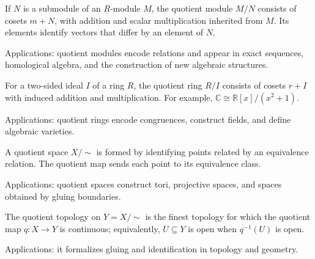 If \(N\) is a submodule of an \(R\)-module \(M\), the quotient module \(M/N\) consists of cosets \(m+N\), with addition and scalar multiplication inherited from \(M\). Its elements identify vectors that differ by an element of \(N\). \par\noindent Applications: quotient modules encode relations and appear in exact sequences, homological algebra, and the construction of new algebraic structures.

For a two-sided ideal $I$ of a ring $R$, the quotient ring $R/I$ consists of cosets $r+I$ with induced addition and multiplication. For example, $\mathbb C\cong\mathbb R[x]/(x^2+1)$. \par\noindent Applications: quotient rings encode congruences, construct fields, and define algebraic varieties.

A quotient space $X/{\sim}$ is formed by identifying points related by an equivalence relation. The quotient map sends each point to its equivalence class. \par\noindent Applications: quotient spaces construct tori, projective spaces, and spaces obtained by gluing boundaries.

The quotient topology on $Y=X/{\sim}$ is the finest topology for which the quotient map $q:X\to Y$ is continuous; equivalently, $U\subseteq Y$ is open when $q^{-1}(U)$ is open. \par\noindent Applications: it formalizes gluing and identification in topology and geometry.
